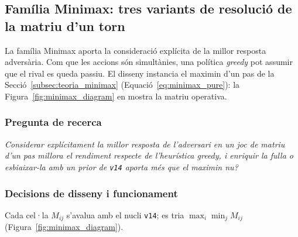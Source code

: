 \subsection{Família Minimax: tres variants de resolució de la matriu d'un torn}

La família Minimax aporta la consideració explícita de la millor resposta adversària. Com que les accions són simultànies, una política \textit{greedy} pot assumir que el rival es queda passiu. El disseny instancia el maximin d'un pas de la Secció~\ref{subsec:teoria_minimax} (Equació~\ref{eq:minimax_pure}): la Figura~\ref{fig:minimax_diagram} en mostra la matriu operativa.

\subsubsection*{Pregunta de recerca}

\emph{Considerar explícitament la millor resposta de l'adversari en un joc de matriu d'un pas millora el rendiment respecte de l'heurística greedy, i enriquir la fulla o esbiaixar-la amb un prior de \texttt{v14} aporta més que el maximin nu?}

\subsubsection*{Decisions de disseny i funcionament}

Cada cel·la $M_{ij}$ s'avalua amb el nucli \texttt{v14}; es tria $\max_i \min_j M_{ij}$ (Figura~\ref{fig:minimax_diagram}).

